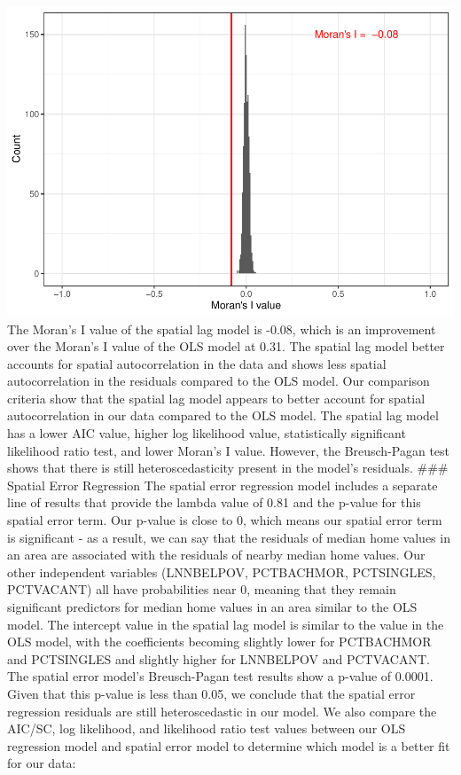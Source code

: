 \documentclass[
]{article}
\begin{document}
\includegraphics{HW2-SpatialRegression_files/figure-latex/unnamed-chunk-5-1.pdf}
The Moran's I value of the spatial lag model is -0.08, which is an
improvement over the Moran's I value of the OLS model at 0.31. The
spatial lag model better accounts for spatial autocorrelation in the
data and shows less spatial autocorrelation in the residuals compared to
the OLS model. Our comparison criteria show that the spatial lag model
appears to better account for spatial autocorrelation in our data
compared to the OLS model. The spatial lag model has a lower AIC value,
higher log likelihood value, statistically significant likelihood ratio
test, and lower Moran's I value. However, the Breusch-Pagan test shows
that there is still heteroscedasticity present in the model's residuals.
\#\#\# Spatial Error Regression The spatial error regression model
includes a separate line of results that provide the lambda value of
0.81 and the p-value for this spatial error term. Our p-value is close
to 0, which means our spatial error term is significant - as a result,
we can say that the residuals of median home values in an area are
associated with the residuals of nearby median home values. Our other
independent variables (LNNBELPOV, PCTBACHMOR, PCTSINGLES, PCTVACANT) all
have probabilities near 0, meaning that they remain significant
predictors for median home values in an area similar to the OLS model.
The intercept value in the spatial lag model is similar to the value in
the OLS model, with the coefficients becoming slightly lower for
PCTBACHMOR and PCTSINGLES and slightly higher for LNNBELPOV and
PCTVACANT. The spatial error model's Breusch-Pagan test results show a
p-value of 0.0001. Given that this p-value is less than 0.05, we
conclude that the spatial error regression residuals are still
heteroscedastic in our model. We also compare the AIC/SC, log
likelihood, and likelihood ratio test values between our OLS regression
model and spatial error model to determine which model is a better fit
for our data:
\end{document}
